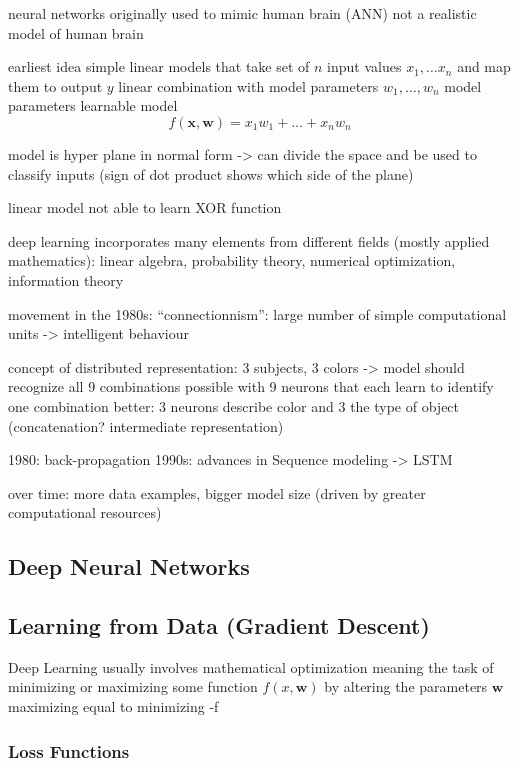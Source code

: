 neural networks originally used to mimic human brain (ANN)
not a realistic model of human brain

earliest idea simple linear models that take set of $n$ input values $x_1, \dots x_n$ and map them to output $y$
linear combination with model parameters $w_1, \dots, w_n$
model parameters learnable
model \[
          f(\boldsymbol{x}, \boldsymbol{w}) = x_1 w_1 + \dots + x_n w_n
\]

model is hyper plane in normal form -> can divide the space and be used to classify inputs
(sign of dot product shows which side of the plane) %

linear model not able to learn XOR function

deep learning incorporates many elements from different fields (mostly applied mathematics): linear algebra, probability theory, numerical optimization, information theory

movement in the 1980s: \enquote{connectionnism}:
large number of simple computational units -> intelligent behaviour

concept of distributed representation:
3 subjects, 3 colors -> model should recognize all 9 combinations
possible with 9 neurons that each learn to identify one combination
better: 3 neurons describe color and 3 the type of object (concatenation? intermediate representation)

1980: back-propagation
1990s: advances in Sequence modeling -> LSTM

over time: more data examples, bigger model size (driven by greater computational resources)



\subsection{Deep Neural Networks}\label{subsec:deep-neural-networks}

\subsection{Learning from Data (Gradient Descent)}\label{subsec:learning-from-data}
Deep Learning usually involves mathematical optimization meaning the task of minimizing or maximizing some function $f(x, \boldsymbol{w})$ by altering the parameters $\boldsymbol{w}$
maximizing equal to minimizing -f

\subsubsection{Loss Functions}

